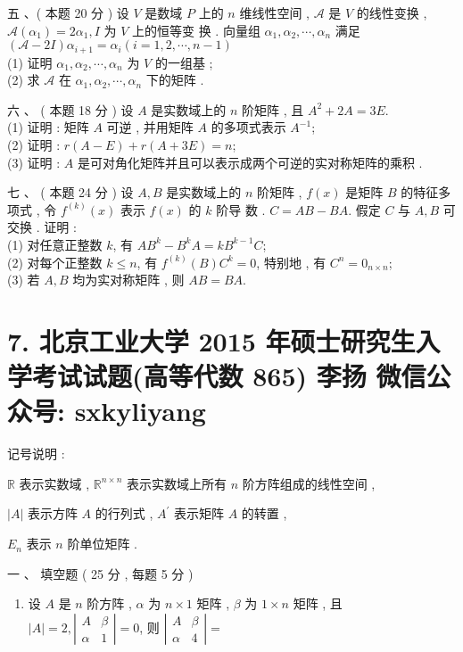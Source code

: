 \documentclass[10pt]{article}
\begin{document}
{ 五 、( 本题  20  分 )  设  $V$  是数域  $P$  上的  $n$  维线性空间 , $\mathscr{A}$  是  $V$  的线性变换 , $\mathscr{A}\left(\alpha_{1}\right)=2 \alpha_{1}, I$  为  $V$  上的恒等变   换 .  向量组  $\alpha_{1}, \alpha_{2}, \cdots, \alpha_{n}$  满足  $(\mathscr{A}-2 I) \alpha_{i+1}=\alpha_{i}(i=1,2, \cdots, n-1)$\\
(1)  证明  $\alpha_{1}, \alpha_{2}, \cdots, \alpha_{n}$  为  $V$  的一组基 ;\\
(2)  求  $\mathscr{A}$  在  $\alpha_{1}, \alpha_{2}, \cdots, \alpha_{n}$  下的矩阵 .

 六 、 ( 本题  18  分 )  设  $A$  是实数域上的  $n$  阶矩阵 ,  且  $A^{2}+2 A=3 E$.\\
(1)  证明 :  矩阵  $A$  可逆 , 并用矩阵  $A$  的多项式表示  $A^{-1}$;\\
(2)  证明 : $r(A-E)+r(A+3 E)=n$;\\
(3)  证明 : $A$  是可对角化矩阵并且可以表示成两个可逆的实对称矩阵的乘积 .

 七 、 ( 本题  24  分 )  设  $A, B$  是实数域上的  $n$  阶矩阵 , $f(x)$  是矩阵  $B$  的特征多项式 ,  令  $f^{(k)}(x)$  表示  $f(x)$  的  $k$  阶导   数 . $C=A B-B A$.  假定  $C$  与  $A, B$  可交换 .  证明 :\\
(1)  对任意正整数  $k$,  有  $A B^{k}-B^{k} A=k B^{k-1} C$;\\
(2)  对每个正整数  $k \leq n$,  有  $f^{(k)}(B) C^{k}=0$,  特别地 ,  有  $C^{n}=0_{n \times n}$;\\
(3)  若  $A, B$  均为实对称矩阵 ,  则  $A B=B A$.

\section{7. 北京工业大学 2015 年硕士研究生入学考试试题(高等代数 865) 
 李扬 
 微信公众号: sxkyliyang}
 记号说明 :

$\mathbb{R}$  表示实数域 , $\mathbb{R}^{n \times n}$  表示实数域上所有  $n$  阶方阵组成的线性空间 ,

$|A|$  表示方阵  $A$  的行列式 , $A^{\prime}$  表示矩阵  $A$  的转置 ,

$E_{n}$  表示  $n$  阶单位矩阵 .

 一 、 填空题  ( 25  分 , 每题 5 分 )

\begin{enumerate}
  \item  设  $A$  是  $n$  阶方阵 , $\alpha$  为  $n \times 1$  矩阵 , $\beta$  为  $1 \times n$  矩阵 ,  且  $|A|=2,\left|\begin{array}{cc}A & \beta \\ \alpha & 1\end{array}\right|=0$,  则  $\left|\begin{array}{cc}A & \beta \\ \alpha & 4\end{array}\right|=$


\end{enumerate}}
\end{document}
